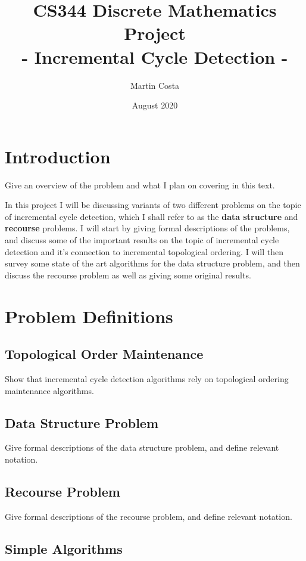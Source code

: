 \documentclass{article}
\title{CS344 Discrete Mathematics Project \\  - Incremental Cycle Detection - }
\author{Martin Costa}
\date{August 2020}
\begin{document}
\maketitle

\tableofcontents

\section{Introduction}

Give an overview of the problem and what I plan on covering in this text.

In this project I will be discussing variants of two different problems on the topic of incremental cycle detection, which I shall refer to as the \textbf{data structure} and \textbf{recourse} problems. I will start by giving formal descriptions of the problems, and discuss some of the important results on the topic of incremental cycle detection and it's connection to incremental topological ordering. I will then survey some state of the art algorithms for the data structure problem, and then discuss the recourse problem as well as giving some original results.

\section{Problem Definitions}

\subsection{Topological Order Maintenance}

Show that incremental cycle detection algorithms rely on topological ordering maintenance algorithms.

\subsection{Data Structure Problem}

Give formal descriptions of the data structure problem, and define relevant notation.

\subsection{Recourse Problem}

Give formal descriptions of the recourse problem, and define relevant notation.

\subsection{Simple Algorithms}
\end{document}
